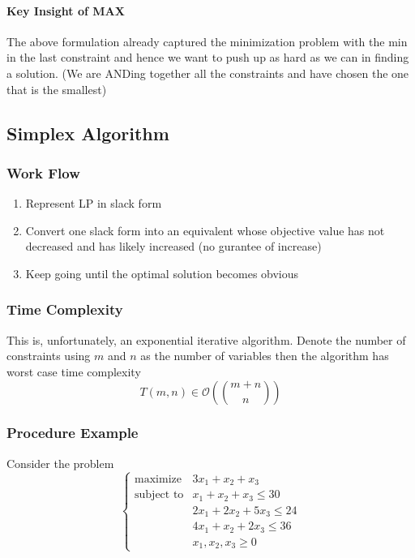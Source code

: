 \documentclass[10pt]{article}
\begin{document}
\paragraph{Key Insight of MAX} The above formulation already captured the minimization problem with the min in the last constraint and hence we want to push up as hard as we can in finding a solution. (We are ANDing together all the constraints and have chosen the one that is the smallest)

\subsection{Simplex Algorithm}

\subsubsection{Work Flow}
\begin{enumerate}
    \item Represent LP in slack form
    \item Convert one slack form into an equivalent whose objective value has not decreased and has likely increased (no gurantee of increase)
    \item Keep going until the optimal solution becomes obvious
\end{enumerate}

\subsubsection{Time Complexity} This is, unfortunately, an exponential iterative algorithm. Denote the number of constraints using $m$ and $n$ as the number of variables then the algorithm has worst case time complexity 
\begin{equation*}
    T(m,n) \in \mathcal{O}\left(\binom{m+n}{n}\right)
\end{equation*}

\subsubsection{Procedure Example}
Consider the problem
$$
\begin{cases}
    \text{maximize} & 3x_1 + x_2 + x_3 \\
    \text{subject to} &x_1 + x_2 + x_3 \leq 30 \\
    &2x_1 + 2x_2 + 5x_3 \leq 24 \\
    &4x_1 + x_2 + 2x_3 \leq 36 \\
    &x_1,x_2,x_3\geq 0
\end{cases}
$$
\end{document}
